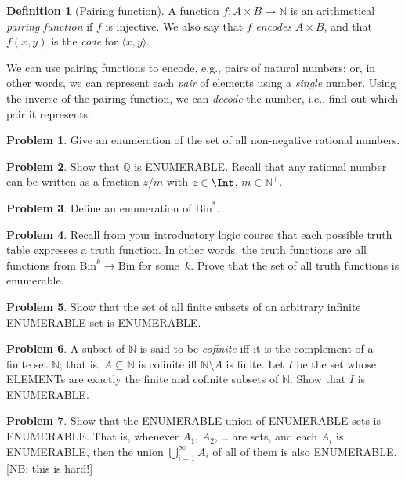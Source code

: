 \documentclass[10pt,a4paper]{article}
\newcommand*{\olup}[1]{\MakeUppercase{#1}}
\theoremstyle{plain}
\theoremstyle{definition}
\newtheorem{defn}[thm]{Definition}
\newtheorem{prob}{Problem}[section]
\theoremstyle{remark}
\newenvironment{explain}{}{}
\providecommand{\tuple}[1]{\langle #1 \rangle}
\providecommand{\Nat}{\ensuremath{\mathbb{N}}}
\providecommand{\Rat}{\mathbb{Q}}
\providecommand{\Bin}{\mathrm{Bin}}
\begin{document}
\begin{defn}[Pairing function] 
  A function $f\colon A \times B \to \Nat$ is an arithmetical
  \emph{pairing function} if $f$ is injective. We also say that $f$
  \emph{encodes} $A \times B$, and that $f(x,y)$ is the
  \emph{code} for $\tuple{x,y}$.
\end{defn}

\begin{explain}
We can use pairing functions to encode, e.g., pairs of natural numbers;
or, in other words, we can represent each \emph{pair} of elements
using a \emph{single} number. Using the inverse of the pairing
function, we can \emph{decode} the number, i.e., find out which
pair it represents.
\end{explain}

\begin{prob}
Give an enumeration of the set of all non-negative rational numbers. 
\end{prob}

\begin{prob}
Show that $\Rat$ is \olup{enumerable}. Recall that any rational number 
can be written as a fraction $z/m$ with $z \in \Int$, $m \in \Nat^+$.
\end{prob}

\begin{prob}
Define an enumeration of $\Bin^*$.
\end{prob}

\begin{prob}
Recall from your introductory logic course that each possible truth
table expresses a truth function. In other words, the truth functions
are all functions from $\Bin^k \to \Bin$ for some~$k$. Prove that the
set of all truth functions is enumerable.
\end{prob}

\begin{prob}
Show that the set of all finite subsets of an arbitrary infinite
\olup{enumerable} set is \olup{enumerable}.
\end{prob}

\begin{prob}
A subset of $\Nat$ is said to be \emph{cofinite} iff it is the
complement of a finite set $\Nat$; that is, $A \subseteq \Nat$ is
cofinite iff $\Nat\setminus A$ is finite. Let $I$ be the set whose
\olup{element}s are exactly the finite and cofinite subsets of $\Nat$.
Show that $I$ is \olup{enumerable}.
\end{prob}

\begin{prob}
Show that the \olup{enumerable} union of \olup{enumerable} sets is
\olup{enumerable}. That is, whenever $A_1$, $A_2$, \dots{} are sets, and
each $A_i$ is \olup{enumerable}, then the union $\bigcup_{i=1}^\infty
A_i$ of all of them is also \olup{enumerable}. [NB: this is hard!]
\end{prob}
\end{document}
